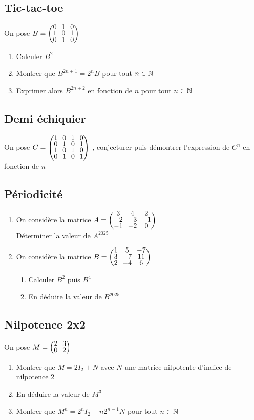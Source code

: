 \documentclass[oneside,12pt]{book}          %
\begin{document}
\subsection{Tic-tac-toe}
On pose $B=\matrice{0&1&0\\1&0&1\\0&1&0} $
    \begin{enumerate}
        \item Calculer $B^2$
        \item Montrer que $B^{2n+1}=2^nB$ pour tout ${n\in\mathbb N}$
        \item Exprimer alors $B^{2n+2}$ en fonction de $n$ pour tout ${n\in\mathbb N}$
    \end{enumerate}



\subsection{Demi échiquier}

On pose $C=\matrice{1&0&1&0\\0&1&0&1\\1&0&1&0\\0&1&0&1} $ , conjecturer puis démontrer l'expression de $C^n$ en fonction de $n$



\subsection{Périodicité}
\begin{enumerate}
    \item On considère la matrice $A=\matrice{3&4&2\\-2&-3&-1\\-1&-2&0} $ \\
    Déterminer la valeur de $A^{2025}$
    \item On considère la matrice $B=\matrice{1&5&-7\\3&-7&11\\2&-4&6}$ 
    \begin{enumerate}
    	\item Calculer $B^2$ puis $B^4$
    	\item En déduire la valeur de $B^{2025}$
    \end{enumerate}
    
\end{enumerate}



\subsection{Nilpotence 2x2}
On pose $M=\matrice{2&3\\0&2} $
    \begin{enumerate}
        \item Montrer que $M=2I_2+N$ avec $N$ une matrice nilpotente d'indice de nilpotence 2
        \item En déduire la valeur de $M^3$
        \item Montrer que $M^n=2^nI_2+n2^{n-1}N$ pour tout ${n\in\mathbb N}$
    \end{enumerate}
    
\end{document}
